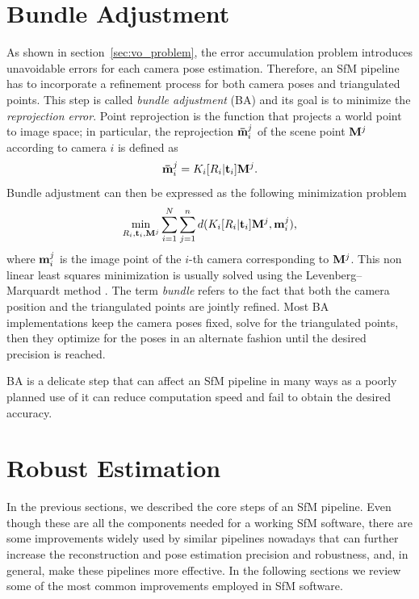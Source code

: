 \section{Bundle Adjustment}
As shown in section~\ref{sec:vo_problem}, the error accumulation problem introduces
unavoidable errors for each camera pose estimation. Therefore, an SfM pipeline has to incorporate a 
refinement process for both camera poses and triangulated points.
This step is called \textit{bundle adjustment} (BA) and its goal is to 
minimize the \textit{reprojection error}.
%
Point reprojection is the function that projects a world point to image space; 
in particular, the reprojection ${\mathbf{\bar{m}}_i}^j$ of the scene point 
$\mathbf{M}^j$ according to camera $i$ is defined as
%
\begin{equation*}
	{\mathbf{\bar{m}}_i}^j = K_i[R_i | \mathbf{t}_i]\mathbf{M}^j	\text{.}
\end{equation*}
%
\noindent Bundle adjustment can then be expressed as the following minimization 
problem
\begin{equation*}
	\label{eq:bundle_adj}
	\min_{R_i, \mathbf{t}_i, \mathbf{M}^j} 
	\sum_{i = 1}^N\sum_{j = 1}^n 
	d(K_i[R_i | \mathbf{t}_i]\mathbf{M}^j, \mathbf{m}_i^j) \text{,}
\end{equation*}
%
\noindent where $\mathbf{m}_i^j$ is the image point of the $i$-th camera
corresponding to $\mathbf{M}^j$.
This non linear least squares minimization is usually solved using the 
Levenberg–Marquardt method 
\cite{triggs1999bundle,Hartley2004,levenberg1944method}.
The term \textit{bundle} refers to the fact that both the camera position and
the triangulated points are jointly refined. Most BA implementations keep the 
camera poses fixed, solve for the triangulated points, then they optimize for the
poses in an alternate fashion until the desired precision is reached.

BA is a delicate step that can affect an SfM pipeline in many ways
\cite{lourakis2009sba,triggs1999bundle,Hartley2004} as a poorly planned use of 
it can reduce computation speed and fail to obtain the desired accuracy.

\section{Robust Estimation}
In the previous sections, we described the core steps of an SfM pipeline.
Even though these are all the components needed for a working SfM software, 
there are some improvements widely used by similar pipelines nowadays
that can further increase the reconstruction and pose estimation 
precision and robustness, and, in general, make these pipelines more effective.
In the following sections we review some of the most common improvements 
employed in SfM software.

